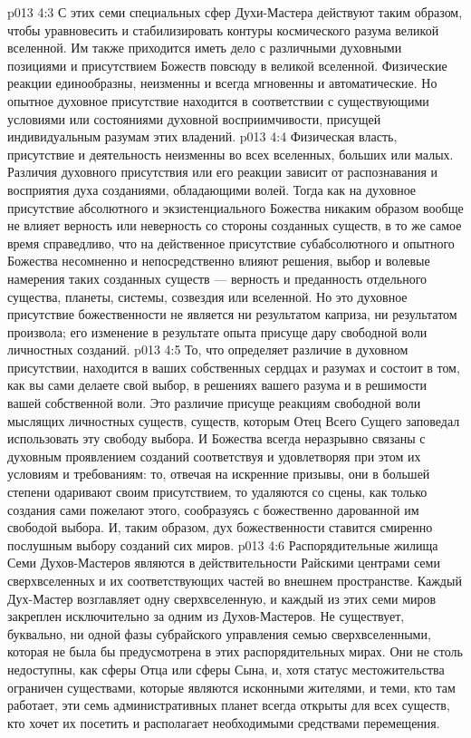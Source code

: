 \vs p013 4:3 С этих семи специальных сфер Духи\hyp{}Мастера действуют таким образом, чтобы уравновесить и стабилизировать контуры космического разума великой вселенной. Им также приходится иметь дело с различными духовными позициями и присутствием Божеств повсюду в великой вселенной. Физические реакции единообразны, неизменны и всегда мгновенны и автоматические. Но опытное духовное присутствие находится в соответствии с существующими условиями или состояниями духовной восприимчивости, присущей индивидуальным разумам этих владений.
\vs p013 4:4 \pc Физическая власть, присутствие и деятельность неизменны во всех вселенных, больших или малых. Различия духовного присутствия или его реакции зависит от распознавания и восприятия духа созданиями, обладающими волей. Тогда как на духовное присутствие абсолютного и экзистенциального Божества никаким образом вообще не влияет верность или неверность со стороны созданных существ, в то же самое время справедливо, что на действенное присутствие субабсолютного и опытного Божества несомненно и непосредственно влияют решения, выбор и волевые намерения таких созданных существ --- верность и преданность отдельного существа, планеты, системы, созвездия или вселенной. Но это духовное присутствие божественности не является ни результатом каприза, ни результатом произвола; его изменение в результате опыта присуще дару свободной воли личностных созданий.
\vs p013 4:5 То, что определяет различие в духовном присутствии, находится в ваших собственных сердцах и разумах и состоит в том, как вы сами делаете свой выбор, в решениях вашего разума и в решимости вашей собственной воли. Это различие присуще реакциям свободной воли мыслящих личностных существ, существ, которым Отец Всего Сущего заповедал использовать эту свободу выбора. И Божества всегда неразрывно связаны с духовным проявлением созданий соответствуя и удовлетворяя при этом их условиям и требованиям: то, отвечая на искренние призывы, они в большей степени одаривают своим присутствием, то удаляются со сцены, как только создания сами пожелают этого, сообразуясь с божественно дарованной им свободой выбора. И, таким образом, дух божественности ставится смиренно послушным выбору созданий сих миров.
\vs p013 4:6 \pc Распорядительные жилища Семи Духов\hyp{}Мастеров являются в действительности Райскими центрами семи сверхвселенных и их соответствующих частей во внешнем пространстве. Каждый Дух\hyp{}Мастер возглавляет одну сверхвселенную, и каждый из этих семи миров закреплен исключительно за одним из Духов\hyp{}Мастеров. Не существует, буквально, ни одной фазы субрайского управления семью сверхвселенными, которая не была бы предусмотрена в этих распорядительных мирах. Они не столь недоступны, как сферы Отца или сферы Сына, и, хотя статус местожительства ограничен существами, которые являются исконными жителями, и теми, кто там работает, эти семь административных планет всегда открыты для всех существ, кто хочет их посетить и располагает необходимыми средствами перемещения.
